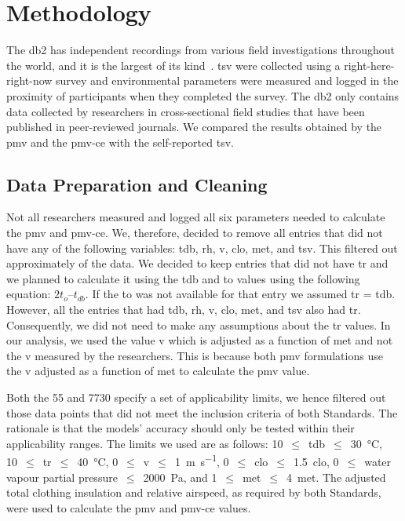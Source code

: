 \section{Methodology}\label{sec:methodology}
The \ac{db2} has  independent recordings from various field investigations throughout the world, and it is the largest of its kind~\cite{FoldvaryLicina2018, db2dryad}.
\Ac{tsv} were collected using a right-here-right-now survey and environmental parameters were measured and logged in the proximity of participants when they completed the survey.
The \ac{db2} only contains data collected by researchers in cross-sectional field studies that have been published in peer-reviewed journals.
 We compared the results obtained by the \ac{pmv} and the \ac{pmv-ce} with the self-reported \ac{tsv}.

\subsection{Data Preparation and Cleaning}\label{subsec:data-processing-and-cleaning}
Not all researchers measured and logged all six parameters needed to calculate the \ac{pmv} and \ac{pmv-ce}.
We, therefore, decided to remove all entries that did not have any of the following variables: \ac{tdb}, \ac{rh}, \ac{v}, \ac{clo}, \ac{met}, and \ac{tsv}.
This filtered out approximately  of the data.
We decided to keep entries that did not have \ac{tr} and we planned to calculate it using the \ac{tdb} and \ac{to} values using the following equation: $2 t_{o} – t_{db}$.
If the \ac{to} was not available for that entry we assumed \ac{tr} = \ac{tdb}.
However, all the entries that had \ac{tdb}, \ac{rh}, \ac{v}, \ac{clo}, \ac{met}, and \ac{tsv} also had \ac{tr}.
Consequently, we did not need to make any assumptions about the \ac{tr} values.
In our analysis, we used the value \ac{v} which is adjusted as a function of \ac{met} and not the \ac{v} measured by the researchers.
This is because both \ac{pmv} formulations use the \ac{v} adjusted as a function of \ac{met} to calculate the \ac{pmv} value.

Both the \gls{55} and \gls{7730} specify a set of applicability limits, we hence filtered out those data points that did not meet the inclusion criteria of both Standards.
The rationale is that the models' accuracy should only be tested within their applicability ranges.
The limits we used are as follows:
\num{10}~$\leq$~\ac{tdb}~$\leq$~\qty{30}{\celsius},
\num{10}~$\leq$~\ac{tr}~$\leq$~\qty{40}{\celsius},
\num{0}~$\leq$~\ac{v}~$\leq$~\qty{1}{\m\per\s},
\num{0}~$\leq$~\ac{clo}~$\leq$~\qty{1.5}{clo},
\num{0}~$\leq$~water vapour partial pressure~$\leq$~\qty{2000}{\pascal},
and \num{1}~$\leq$~\ac{met}~$\leq$~\qty{4}{met}.
The adjusted total clothing insulation and relative airspeed, as required by both Standards, were used to calculate the \ac{pmv} and \ac{pmv-ce} values.


